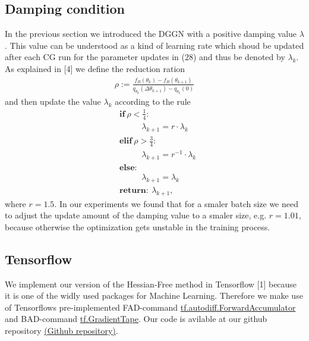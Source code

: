 \documentclass[conference]{IEEEtran}
\begin{document}
\subsection{Damping condition}
In the previous section we introduced the DGGN with a positive damping value $\lambda$. This value can be understood as a kind of learning rate which shoud be updated after each CG run for the parameter updates in (28) and thus be denoted by $\lambda_{k}$. As explained in [4] we define the reduction ration
\begin{align}
\rho := \frac{f_{B}(\theta_{k}) - f_{B}(\theta_{k+1})}{q_{\theta_{k}}(\Delta\theta_{k + 1}) - q_{\theta_{k}}(0)}
\end{align}
and then update the value $\lambda_{k}$ according to the rule
\begin{align}
&\textbf{if}\:\rho<\frac{1}{4}:\\
 &\text{ }\text{ }\text{ }\text{ }\lambda_{k+1} = r\cdot\lambda_{k}\\
&\textbf{elif}\:\rho>\frac{3}{4}:\\
 &\text{ }\text{ }\text{ }\text{ }\lambda_{k + 1} = r^{-1}\cdot\lambda_{k}\\
&\textbf{else}: \\
 &\text{ }\text{ }\text{ }\text{ }\lambda_{k + 1} = \lambda_{k}\\
&\textbf{return}:\:\lambda_{k + 1},
\end{align}
where $r=1.5$.
In our experiments we found that for a smaler batch size we need to adjust the update amount of the damping value to a smaler size, e.g. $r=1.01$, because otherwise the optimization gets unstable in the training process.



\subsection{Tensorflow}
We implement our version of the Hessian-Free method in Tensorflow [1] because it is one of the widly used packages for Machine Learning.
Therefore we make use of Tensorflows pre-implemented FAD-command \href{https://www.tensorflow.org/api_docs/python/tf/autodiff/ForwardAccumulator}{tf.autodiff.ForwardAccumulator} and BAD-command \href{https://www.tensorflow.org/api_docs/python/tf/GradientTape}{tf.GradientTape}. Our code is avilable at our github repository \href{https://github.com/NiklasBrunn/Hessian_Free_Optimization_of_Deep_Neural_Networks}{(Github repository)}.
\end{document}
